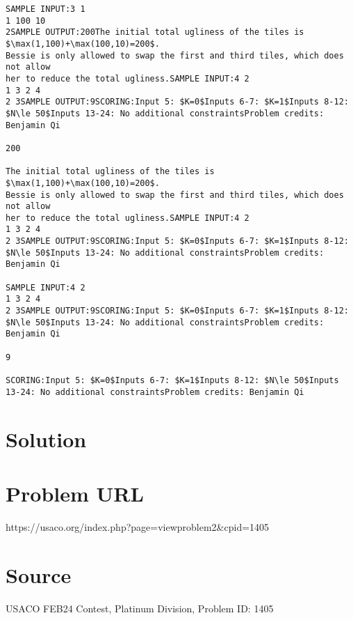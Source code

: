 \documentclass[12pt]{article}
\begin{document}
\begin{verbatim}
SAMPLE INPUT:3 1
1 100 10
2SAMPLE OUTPUT:200The initial total ugliness of the tiles is $\max(1,100)+\max(100,10)=200$.
Bessie is only allowed to swap the first and third tiles, which does not allow
her to reduce the total ugliness.SAMPLE INPUT:4 2
1 3 2 4
2 3SAMPLE OUTPUT:9SCORING:Input 5: $K=0$Inputs 6-7: $K=1$Inputs 8-12: $N\le 50$Inputs 13-24: No additional constraintsProblem credits: Benjamin Qi

200

The initial total ugliness of the tiles is $\max(1,100)+\max(100,10)=200$.
Bessie is only allowed to swap the first and third tiles, which does not allow
her to reduce the total ugliness.SAMPLE INPUT:4 2
1 3 2 4
2 3SAMPLE OUTPUT:9SCORING:Input 5: $K=0$Inputs 6-7: $K=1$Inputs 8-12: $N\le 50$Inputs 13-24: No additional constraintsProblem credits: Benjamin Qi

SAMPLE INPUT:4 2
1 3 2 4
2 3SAMPLE OUTPUT:9SCORING:Input 5: $K=0$Inputs 6-7: $K=1$Inputs 8-12: $N\le 50$Inputs 13-24: No additional constraintsProblem credits: Benjamin Qi

9

SCORING:Input 5: $K=0$Inputs 6-7: $K=1$Inputs 8-12: $N\le 50$Inputs 13-24: No additional constraintsProblem credits: Benjamin Qi
\end{verbatim}

\section*{Solution}


\section*{Problem URL}
https://usaco.org/index.php?page=viewproblem2&cpid=1405

\section*{Source}
USACO FEB24 Contest, Platinum Division, Problem ID: 1405
\end{document}
